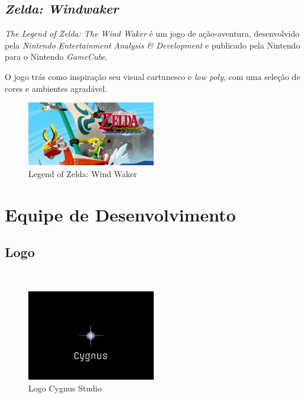 \clearpage

\subsection{\textit{Zelda: Windwaker}}
\textit{The Legend of Zelda: The Wind Waker} é um jogo de ação-aventura, desenvolvido pela \textit{Nintendo Entertainment Analysis \& Development} e publicado pela Nintendo para o Nintendo \textit{GameCube}.

O jogo trás como inspiração seu visual cartunesco e \textit{low poly}, com uma seleção de cores e ambientes agradável.

\begin{figure}[!htb] \caption{\label{fig_zelda}Legend of Zelda: Wind Waker} \begin{center}
\includegraphics[width=0.5\textwidth]{imagens/windwaker.jpeg} \end{center}
 \end{figure}

\clearpage

\section{Equipe de Desenvolvimento}

\subsection{Logo}

~

\begin{figure}[!htb] \caption{\label{fig_logo}Logo Cygnus Studio} \begin{center}
\includegraphics[width=0.5\textwidth]{imagens/logo.png}\end{center}
 \end{figure}

